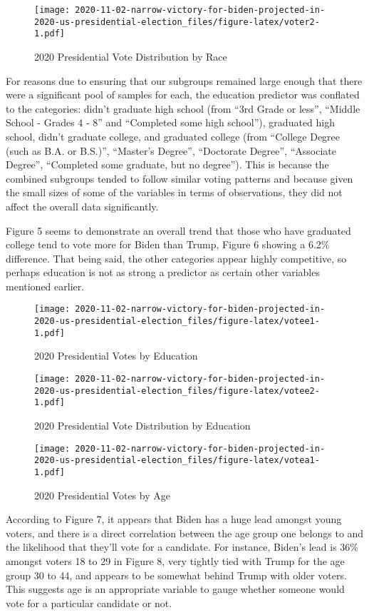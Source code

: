 \documentclass[
]{article}
\begin{document}
\begin{figure}
\centering
\texttt{[image: 2020-11-02-narrow-victory-for-biden-projected-in-2020-us-presidential-election\_files/figure-latex/voter2-1.pdf]}
\caption{\label{fig:voter2}2020 Presidential Vote Distribution by Race}
\end{figure}

For reasons due to ensuring that our subgroups remained large enough that there were a significant pool of samples for each, the education predictor was conflated to the categories: didn't graduate high school (from ``3rd Grade or less'', ``Middle School - Grades 4 - 8'' and ``Completed some high school''), graduated high school, didn't graduate college, and graduated college (from ``College Degree (such as B.A. or B.S.)'', ``Master's Degree'', ``Doctorate Degree'', ``Associate Degree'', ``Completed some graduate, but no degree''). This is because the combined subgroups tended to follow similar voting patterns and because given the small sizes of some of the variables in terms of observations, they did not affect the overall data significantly.

Figure 5 seems to demonstrate an overall trend that those who have graduated college tend to vote more for Biden than Trump, Figure 6 showing a 6.2\% difference. That being said, the other categories appear highly competitive, so perhaps education is not as strong a predictor as certain other variables mentioned earlier.

\begin{figure}
\centering
\texttt{[image: 2020-11-02-narrow-victory-for-biden-projected-in-2020-us-presidential-election\_files/figure-latex/votee1-1.pdf]}
\caption{\label{fig:votee1}2020 Presidential Votes by Education}
\end{figure}

\begin{figure}
\centering
\texttt{[image: 2020-11-02-narrow-victory-for-biden-projected-in-2020-us-presidential-election\_files/figure-latex/votee2-1.pdf]}
\caption{\label{fig:votee2}2020 Presidential Vote Distribution by Education}
\end{figure}

\begin{figure}
\centering
\texttt{[image: 2020-11-02-narrow-victory-for-biden-projected-in-2020-us-presidential-election\_files/figure-latex/votea1-1.pdf]}
\caption{\label{fig:votea1}2020 Presidential Votes by Age}
\end{figure}

According to Figure 7, it appears that Biden has a huge lead amongst young voters, and there is a direct correlation between the age group one belongs to and the likelihood that they'll vote for a candidate. For instance, Biden's lead is 36\% amongst voters 18 to 29 in Figure 8, very tightly tied with Trump for the age group 30 to 44, and appears to be somewhat behind Trump with older voters. This suggests age is an appropriate variable to gauge whether someone would vote for a particular candidate or not.
\end{document}
